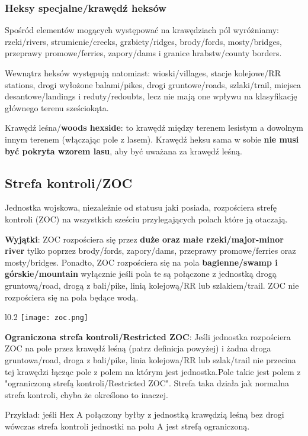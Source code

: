 \subsubsection*{Heksy specjalne/krawędź heksów}
Spośród elementów mogących występować na krawędziach pól wyróżniamy: rzeki/rivers, strumienie/creeks, grzbiety/ridges, brody/fords, mosty/bridges, przeprawy promowe/ferries, zapory/dams i granice hrabstw/county borders.\par
Wewnątrz heksów występują natomiast: wioski/villages, stacje kolejowe/RR stations, drogi wyłożone balami/pikes, drogi gruntowe/roads, szlaki/trail, miejsca desantowe/landings i reduty/redoubts, lecz nie mają one wpływu na klasyfikację głównego terenu sześciokąta.\par
Krawędź leśna/\textbf{woods hexside}: to krawędź między terenem lesistym a dowolnym innym terenem (włączając pole z lasem). Krawędź heksu sama w sobie \textbf{nie musi być pokryta wzorem lasu}, aby być uważana za krawędź leśną.

\subsection{Strefa kontroli/ZOC}
Jednostka wojskowa, niezależnie od statusu jaki posiada, rozpościera strefę kontroli (ZOC) na wszystkich sześciu przylegających polach które ją otaczają.\par
\textbf{Wyjątki}: ZOC rozpościera się przez \textbf{duże oraz małe rzeki/major-minor river} tylko poprzez brody/fords, zapory/dams, przeprawy promowe/ferries oraz mosty/bridges. Ponadto, ZOC rozpościera się na pola \textbf{bagienne/swamp i górskie/mountain} wyłącznie jeśli pola te są połączone z jednostką drogą gruntową/road, drogą z bali/pike, linią kolejową/RR lub szlakiem/trail. ZOC nie rozpościera się na pola będące wodą.
\begin{wrapfigure}{l}{0.2\textwidth}
    \texttt{[image: zoc.png]}
\end{wrapfigure}\par
\textbf{Ograniczona strefa kontroli/Restricted ZOC}: Jeśli jednostka rozpościera ZOC na pole przez krawędź leśną (patrz definicja powyżej) i żadna droga gruntowa/road, droga z bali/pike, linia kolejowa/RR lub szlak/trail nie przecina tej krawędzi łącząc pole z polem na którym jest jednostka.Pole takie jest polem z "ograniczoną strefą kontroli/Restricted ZOC". Strefa taka działa jak normalna strefa kontroli, chyba że określono to inaczej.\par
Przykład: jeśli Hex A połączony byłby z jednostką krawędzią leśną bez drogi wówczas strefa kontroli jednostki na polu A jest strefą ograniczoną.

